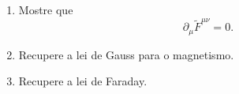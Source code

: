 \begin{enumerate}
            \begin{enumerate}
                  \item Mostre que
                        $$
                              \partial_\mu\widetilde F^{\mu\nu}=0.
                        $$

                  \item Recupere a lei de Gauss para o magnetismo.

                  \item Recupere a lei de Faraday.
            \end{enumerate}

\end{enumerate}


